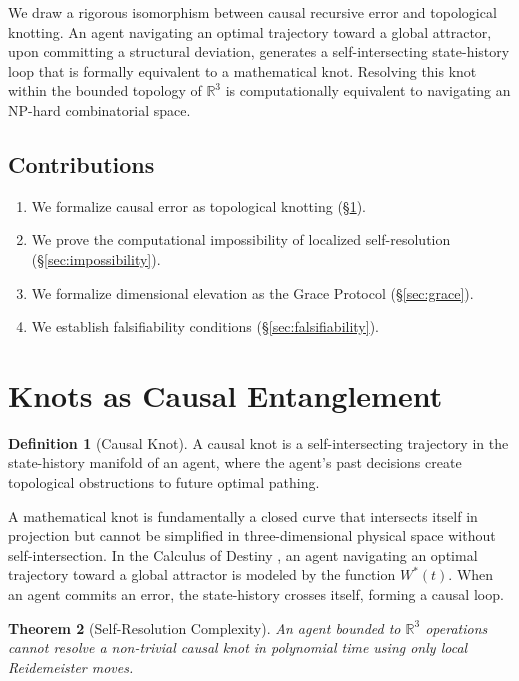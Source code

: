 \documentclass[12pt, a4paper]{article}
\theoremstyle{plain}
\newtheorem{theorem}{Theorem}[section]
\theoremstyle{definition}
\newtheorem{definition}[theorem]{Definition}
\begin{document}
We draw a rigorous isomorphism between causal recursive error and topological knotting. An agent navigating an optimal trajectory toward a global attractor, upon committing a structural deviation, generates a self-intersecting state-history loop that is formally equivalent to a mathematical knot. Resolving this knot within the bounded topology of $\mathbb{R}^3$ is computationally equivalent to navigating an NP-hard combinatorial space.

\subsection{Contributions}
\begin{enumerate}
    \item We formalize causal error as topological knotting (\S\ref{sec:knots}).
    \item We prove the computational impossibility of localized self-resolution (\S\ref{sec:impossibility}).
    \item We formalize dimensional elevation as the Grace Protocol (\S\ref{sec:grace}).
    \item We establish falsifiability conditions (\S\ref{sec:falsifiability}).
\end{enumerate}

\section{Knots as Causal Entanglement}\label{sec:knots}

\begin{definition}[Causal Knot]
A causal knot is a self-intersecting trajectory in the state-history manifold of an agent, where the agent's past decisions create topological obstructions to future optimal pathing.
\end{definition}

A mathematical knot is fundamentally a closed curve that intersects itself in projection but cannot be simplified in three-dimensional physical space without self-intersection. In the Calculus of Destiny \citep{DePaz2026Destiny}, an agent navigating an optimal trajectory toward a global attractor is modeled by the function $W^*(t)$. When an agent commits an error, the state-history crosses itself, forming a causal loop.

\begin{theorem}[Self-Resolution Complexity]
An agent bounded to $\mathbb{R}^3$ operations cannot resolve a non-trivial causal knot in polynomial time using only local Reidemeister moves.
\end{theorem}
\end{document}
